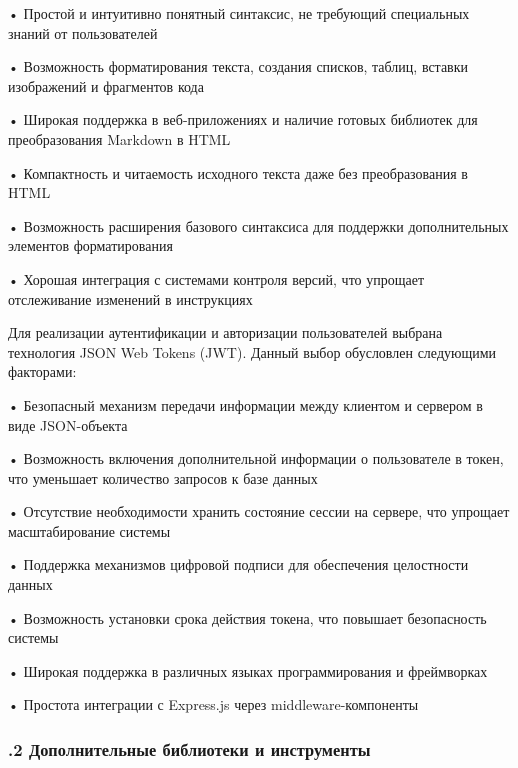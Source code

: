 {  \par \redline • Простой и интуитивно понятный синтаксис, не требующий специальных знаний от пользователей
  \par \redline • Возможность форматирования текста, создания списков, таблиц, вставки изображений и фрагментов кода
  \par \redline • Широкая поддержка в веб-приложениях и наличие готовых библиотек для преобразования Markdown в HTML
  \par \redline • Компактность и читаемость исходного текста даже без преобразования в HTML
  \par \redline • Возможность расширения базового синтаксиса для поддержки дополнительных элементов форматирования
  \par \redline • Хорошая интеграция с системами контроля версий, что упрощает отслеживание изменений в инструкциях

  \par \redline Для реализации аутентификации и авторизации пользователей выбрана технология JSON Web Tokens (JWT). Данный выбор обусловлен следующими факторами:
  
  \par \redline • Безопасный механизм передачи информации между клиентом и сервером в виде JSON-объекта
  \par \redline • Возможность включения дополнительной информации о пользователе в токен, что уменьшает количество запросов к базе данных
  \par \redline • Отсутствие необходимости хранить состояние сессии на сервере, что упрощает масштабирование системы
  \par \redline • Поддержка механизмов цифровой подписи для обеспечения целостности данных
  \par \redline • Возможность установки срока действия токена, что повышает безопасность системы
  \par \redline • Широкая поддержка в различных языках программирования и фреймворках
  \par \redline • Простота интеграции с Express.js через middleware-компоненты

  \par
}

\subtitlespace

\subsubsection*{ 
  \gostTitleFont
  .2 Дополнительные библиотеки и инструменты
} 

